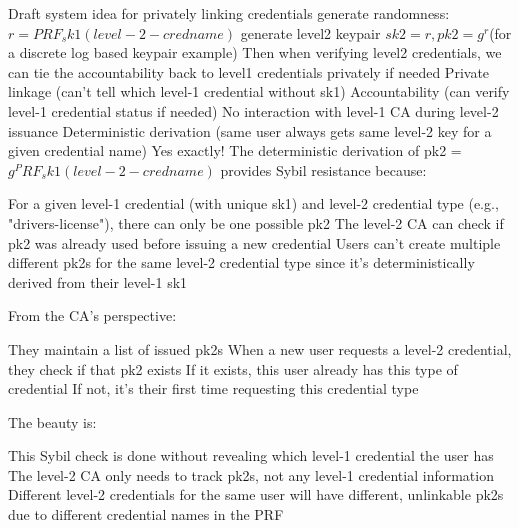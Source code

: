 Draft system idea for privately linking credentials
generate randomness: $r = PRF_sk1(level-2-credname)$
generate level2 keypair $sk2 = r, pk2 = g^r $(for a discrete log based keypair example)
Then when verifying level2 credentials, we can tie the accountability back to level1 credentials privately if needed
Private linkage (can't tell which level-1 credential without sk1)
Accountability (can verify level-1 credential status if needed)
No interaction with level-1 CA during level-2 issuance
Deterministic derivation (same user always gets same level-2 key for a given credential name)
Yes exactly! The deterministic derivation of pk2 = $g^PRF_sk1(level-2-credname)$ provides Sybil resistance because:

For a given level-1 credential (with unique sk1) and level-2 credential type (e.g., "drivers-license"), there can only be one possible pk2
The level-2 CA can check if pk2 was already used before issuing a new credential
Users can't create multiple different pk2s for the same level-2 credential type since it's deterministically derived from their level-1 sk1

From the CA's perspective:

They maintain a list of issued pk2s
When a new user requests a level-2 credential, they check if that pk2 exists
If it exists, this user already has this type of credential
If not, it's their first time requesting this credential type

The beauty is:

This Sybil check is done without revealing which level-1 credential the user has
The level-2 CA only needs to track pk2s, not any level-1 credential information
Different level-2 credentials for the same user will have different, unlinkable pk2s due to different credential names in the PRF